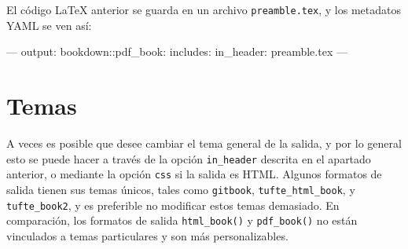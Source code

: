 \documentclass[12pt,]{krantz}
\makeatletter
\newenvironment{Shaded}{\begin{snugshade}}{\end{snugshade}}
\newcommand{\CommentTok}[1]{\textcolor[rgb]{0.56,0.35,0.01}{\textit{#1}}}
\newcommand{\OtherTok}[1]{\textcolor[rgb]{0.56,0.35,0.01}{#1}}
\newcommand{\FunctionTok}[1]{\textcolor[rgb]{0.00,0.00,0.00}{#1}}
\newcommand{\BuiltInTok}[1]{#1}
\newcommand{\ExtensionTok}[1]{#1}
\newcommand{\AttributeTok}[1]{\textcolor[rgb]{0.77,0.63,0.00}{#1}}
\newcommand{\NormalTok}[1]{#1}
\newenvironment{kframe}{%
\medskip{}
\setlength{\fboxsep}{.8em}
 \def\at@end@of@kframe{}%
 \ifinner\ifhmode%
  \def\at@end@of@kframe{\end{minipage}}%
  \begin{minipage}{\columnwidth}%
 \fi\fi%
 \def\FrameCommand##1{\hskip\@totalleftmargin \hskip-\fboxsep
 \colorbox{shadecolor}{##1}\hskip-\fboxsep
     \hskip-\linewidth \hskip-\@totalleftmargin \hskip\columnwidth}%
 \MakeFramed {\advance\hsize-\width
   \@totalleftmargin\z@ \linewidth\hsize
   \@setminipage}}%
 {\par\unskip\endMakeFramed%
 \at@end@of@kframe}
\renewenvironment{Shaded}{\begin{kframe}}{\end{kframe}}
\theoremstyle{definition}
\theoremstyle{definition}
\theoremstyle{definition}
\theoremstyle{remark}
\makeatother
\begin{document}
\begin{Shaded}
\end{Shaded}

El código LaTeX anterior se guarda en un archivo \texttt{preamble.tex},
y los metadatos YAML se ven así:

\begin{Shaded}
\begin{Highlighting}[]
\OtherTok{---}
\FunctionTok{output:}
  \FunctionTok{bookdown:}\AttributeTok{:pdf_book:}
    \FunctionTok{includes:}
      \FunctionTok{in_header:}\AttributeTok{ preamble.tex}
\OtherTok{---}
\end{Highlighting}
\end{Shaded}

\section{Temas}\label{temas}

A veces es posible que desee cambiar el tema general de la salida, y por
lo general esto se puede hacer a través de la opción \texttt{in\_header}
descrita en el apartado anterior, o mediante la opción \texttt{css} si
la salida es HTML. Algunos formatos de salida tienen sus temas únicos,
tales como \texttt{gitbook}, \texttt{tufte\_html\_book}, y
\texttt{tufte\_book2}, y es preferible no modificar estos temas
demasiado. En comparación, los formatos de salida \texttt{html\_book()}
y \texttt{pdf\_book()} no están vinculados a temas particulares y son
más personalizables.
\end{document}
